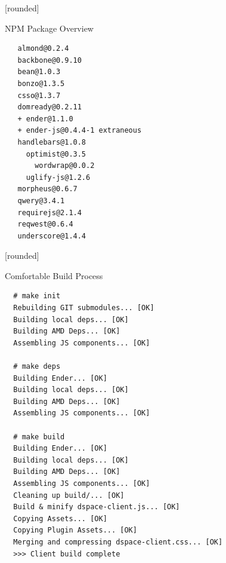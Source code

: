 \documentclass{beamer}
\newcommand\Fontvi{\fontsize{6}{7.2}\selectfont}
\begin{document}
[rounded]
\begin{frame}[fragile]{NPM Package Overview}
\Fontvi
{}
\begin{block}{}
\begin{lstlisting}
   almond@0.2.4
   backbone@0.9.10
   bean@1.0.3
   bonzo@1.3.5
   csso@1.3.7
   domready@0.2.11
   + ender@1.1.0
   + ender-js@0.4.4-1 extraneous
   handlebars@1.0.8
     optimist@0.3.5
       wordwrap@0.0.2
     uglify-js@1.2.6
   morpheus@0.6.7
   qwery@3.4.1
   requirejs@2.1.4
   reqwest@0.6.4
   underscore@1.4.4
\end{lstlisting}
\end{block}
\end{frame}

[rounded]
\begin{frame}[fragile]{Comfortable Build Process}
\Fontvi
{}
\begin{block}{}
\begin{lstlisting}
  # make init
  Rebuilding GIT submodules... [OK]
  Building local deps... [OK]
  Building AMD Deps... [OK]
  Assembling JS components... [OK]

  # make deps
  Building Ender... [OK]
  Building local deps... [OK]
  Building AMD Deps... [OK]
  Assembling JS components... [OK]

  # make build
  Building Ender... [OK]
  Building local deps... [OK]
  Building AMD Deps... [OK]
  Assembling JS components... [OK]
  Cleaning up build/... [OK]
  Build & minify dspace-client.js... [OK]
  Copying Assets... [OK]
  Copying Plugin Assets... [OK]
  Merging and compressing dspace-client.css... [OK]
  >>> Client build complete
\end{lstlisting}
\end{block}
\end{frame}
\end{document}
